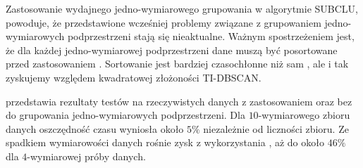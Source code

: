 



Zastosowanie wydajnego jedno-wymiarowego grupowania w algorytmie SUBCLU, powoduje, że przedstawione wcześniej problemy związane z grupowaniem jedno-wymiarowych podprzestrzeni stają się nieaktualne. Ważnym spostrzeżeniem jest, że dla każdej jedno-wymiarowej podprzestrzeni dane muszą być posortowane przed zastosowaniem . Sortowanie jest bardziej czasochłonne niż sam , ale i tak zyskujemy względem kwadratowej złożoności \mbox{TI-DBSCAN}.\par
{} przedstawia rezultaty testów na rzeczywistych danych z zastosowaniem oraz bez  do grupowania jedno-wymiarowych podprzestrzeni. Dla $ 10 $-wymiarowego zbioru danych oszczędność czasu wyniosła około $ 5\% $ niezależnie od liczności zbioru. Ze spadkiem wymiarowości danych rośnie zysk z wykorzystania , aż do około $ 46\% $ dla $ 4 $-wymiarowej próby danych.
